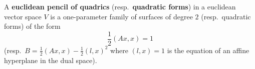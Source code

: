 A \textbf{euclidean pencil of quadrics} (resp.\ \textbf{quadratic forms}) in a euclidean vector space $V$ is a one-parameter family of surfaces of degree $2$ (resp.\ quadratic forms) of the form
$$\frac{1}{2}(A x, x) = 1$$
(resp.\ $B = \frac{1}{2}(A x, x) - \frac{1}{2}(l, x)^2$ where $(l, x) = 1$ is the equation of an affine hyperplane in the dual space).
